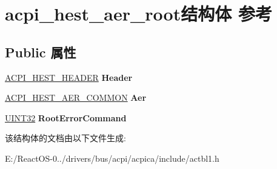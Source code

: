 \hypertarget{structacpi__hest__aer__root}{}\section{acpi\+\_\+hest\+\_\+aer\+\_\+root结构体 参考}
\label{structacpi__hest__aer__root}
\subsection*{Public 属性}
\begin{DoxyCompactItemize}
\item 
\mbox{\label{structacpi__hest__aer__root_a2376b4a869a3e1e573cbd8a0aa9428d1}} 
\hyperlink{structacpi__hest__header}{A\+C\+P\+I\+\_\+\+H\+E\+S\+T\+\_\+\+H\+E\+A\+D\+ER} {\bfseries Header}
\item 
\mbox{\label{structacpi__hest__aer__root_a0410fe7e64f35ed860f64bc83caf6abf}} 
\hyperlink{structacpi__hest__aer__common}{A\+C\+P\+I\+\_\+\+H\+E\+S\+T\+\_\+\+A\+E\+R\+\_\+\+C\+O\+M\+M\+ON} {\bfseries Aer}
\item 
\mbox{\label{structacpi__hest__aer__root_a208693c8f1a34f7035f8790feb473313}} 
\hyperlink{_processor_bind_8h_ae1e6edbbc26d6fbc71a90190d0266018}{U\+I\+N\+T32} {\bfseries Root\+Error\+Command}
\end{DoxyCompactItemize}


该结构体的文档由以下文件生成\+:\begin{DoxyCompactItemize}
\item 
E\+:/\+React\+O\+S-\/0../drivers/bus/acpi/acpica/include/actbl1.\+h\end{DoxyCompactItemize}
